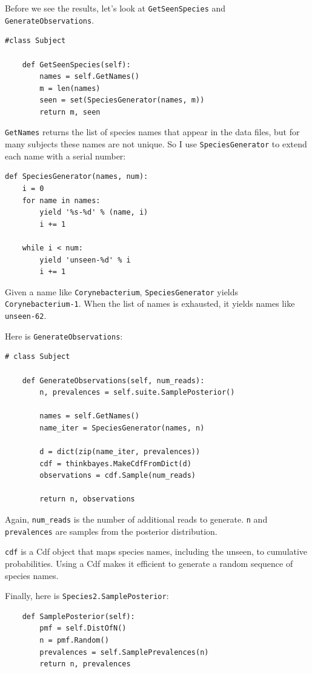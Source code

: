 \documentclass[12pt]{book}
\begin{document}
Before we see the results, let's look at {\tt GetSeenSpecies} and
{\tt GenerateObservations}.

\begin{verbatim}
#class Subject

    def GetSeenSpecies(self):
        names = self.GetNames()
        m = len(names)
        seen = set(SpeciesGenerator(names, m))
        return m, seen
\end{verbatim}

{\tt GetNames} returns the list of species names that appear in
the data files, but for many subjects these names are not unique.
So I use {\tt SpeciesGenerator} to extend each name with a serial
number:

\begin{verbatim}
def SpeciesGenerator(names, num):
    i = 0
    for name in names:
        yield '%s-%d' % (name, i)
        i += 1

    while i < num:
        yield 'unseen-%d' % i
        i += 1
\end{verbatim}

Given a name like {\tt Corynebacterium}, {\tt SpeciesGenerator} yields
{\tt Corynebacterium-1}.  When the list of names is exhausted, it
yields names like {\tt unseen-62}.

Here is {\tt GenerateObservations}:

\begin{verbatim}
# class Subject

    def GenerateObservations(self, num_reads):
        n, prevalences = self.suite.SamplePosterior()

        names = self.GetNames()
        name_iter = SpeciesGenerator(names, n)

        d = dict(zip(name_iter, prevalences))
        cdf = thinkbayes.MakeCdfFromDict(d)
        observations = cdf.Sample(num_reads)

        return n, observations
\end{verbatim}

Again, \verb"num_reads" is the number of additional reads
to generate.  {\tt n} and {\tt prevalences} are samples from
the posterior distribution.

{\tt cdf} is a Cdf object that maps species names, including the
unseen, to cumulative probabilities.  Using a Cdf makes it efficient
to generate a random sequence of species names.

Finally, here is {\tt Species2.SamplePosterior}:

\begin{verbatim}
    def SamplePosterior(self):
        pmf = self.DistOfN()
        n = pmf.Random()
        prevalences = self.SamplePrevalences(n)
        return n, prevalences
\end{verbatim}
\end{document}
